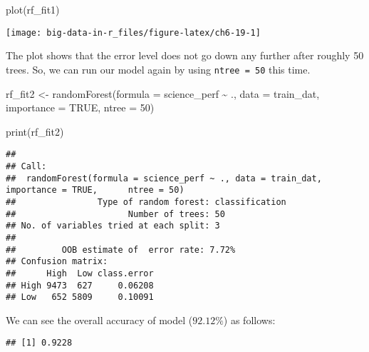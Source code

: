 \documentclass[
]{book}
\newenvironment{Shaded}{\begin{snugshade}}{\end{snugshade}}
\newcommand{\AttributeTok}[1]{\textcolor[rgb]{0.77,0.63,0.00}{#1}}
\newcommand{\ConstantTok}[1]{\textcolor[rgb]{0.00,0.00,0.00}{#1}}
\newcommand{\DecValTok}[1]{\textcolor[rgb]{0.00,0.00,0.81}{#1}}
\newcommand{\FunctionTok}[1]{\textcolor[rgb]{0.00,0.00,0.00}{#1}}
\newcommand{\NormalTok}[1]{#1}
\newcommand{\OtherTok}[1]{\textcolor[rgb]{0.56,0.35,0.01}{#1}}
\newcommand{\SpecialCharTok}[1]{\textcolor[rgb]{0.00,0.00,0.00}{#1}}
\begin{document}
\begin{Shaded}
\begin{Highlighting}[]
\FunctionTok{plot}\NormalTok{(rf\_fit1)}
\end{Highlighting}
\end{Shaded}

\texttt{[image: big-data-in-r\_files/figure-latex/ch6-19-1]}

The plot shows that the error level does not go down any further after roughly 50 trees. So, we can run our model again by using \texttt{ntree\ =\ 50} this time.

\begin{Shaded}
\begin{Highlighting}[]
\NormalTok{rf\_fit2 }\OtherTok{\textless{}{-}} \FunctionTok{randomForest}\NormalTok{(}\AttributeTok{formula =}\NormalTok{ science\_perf }\SpecialCharTok{\textasciitilde{}}\NormalTok{ .,}
                        \AttributeTok{data =}\NormalTok{ train\_dat,}
                        \AttributeTok{importance =} \ConstantTok{TRUE}\NormalTok{, }\AttributeTok{ntree =} \DecValTok{50}\NormalTok{)}

\FunctionTok{print}\NormalTok{(rf\_fit2)}
\end{Highlighting}
\end{Shaded}

\begin{verbatim}
## 
## Call:
##  randomForest(formula = science_perf ~ ., data = train_dat, importance = TRUE,      ntree = 50) 
##                Type of random forest: classification
##                      Number of trees: 50
## No. of variables tried at each split: 3
## 
##         OOB estimate of  error rate: 7.72%
## Confusion matrix:
##      High  Low class.error
## High 9473  627     0.06208
## Low   652 5809     0.10091
\end{verbatim}

We can see the overall accuracy of model (\(92.12\%\)) as follows:

\begin{Shaded}
\end{Shaded}

\begin{verbatim}
## [1] 0.9228
\end{verbatim}
\end{document}
